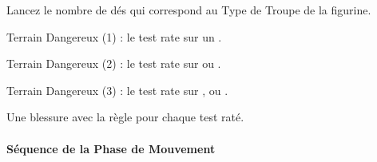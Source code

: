 {\begin{minipage}[t]{.35\linewidth}
\begin{framed}
Lancez le nombre de dés qui correspond au Type de Troupe de la figurine.

\vspace*{3pt}
Terrain Dangereux (1) : le test rate sur un .

\vspace*{3pt}
Terrain Dangereux (2) : le test rate sur  ou .

\vspace*{3pt}
Terrain Dangereux (3) : le test rate sur ,  ou .

\vspace*{3pt}
Une blessure avec la règle  pour chaque test raté.
\end{framed}

\end{minipage}\hfill\begin{minipage}[t]{.60\linewidth}

\paragraph{Séquence de la Phase de Mouvement}


\end{minipage}}
